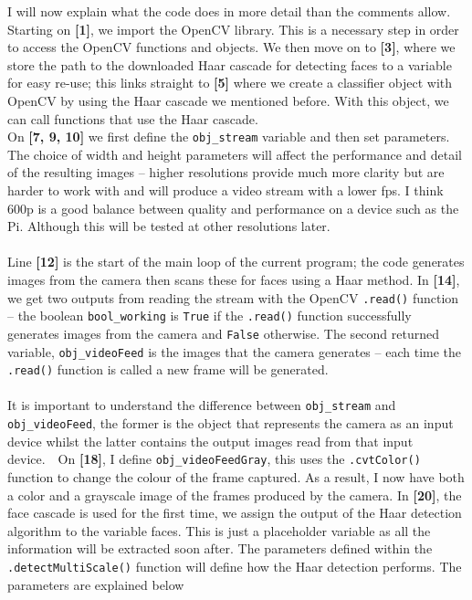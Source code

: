 \documentclass[9pt]{article}
\begin{document}
I will now explain what the code does in more detail than the comments allow.\\
Starting on \textbf{[1]}, we import the OpenCV library. This is a necessary step in order to access the OpenCV functions and objects. We then move on to \textbf{[3]}, where we store the path to the downloaded Haar cascade for detecting faces to a variable for easy re-use; this links straight to \textbf{[5]} where we create a classifier object with OpenCV by using the Haar cascade we mentioned before. With this object, we can call functions that use the Haar cascade.\\
On \textbf{[7, 9, 10]} we first define the \texttt{obj\_stream} variable and then set parameters. The choice of width and height parameters will affect the performance and detail of the resulting images -- higher resolutions provide much more clarity but are harder to work with and will produce a video stream with a lower fps. I think 600p is a good balance between quality and performance on a device such as the Pi. Although this will be tested at other resolutions later.\\\\
Line \textbf{[12]} is the start of the main loop of the current program; the code generates images from the camera then scans these for faces using a Haar method. In \textbf{[14]}, we get two outputs from reading the stream with the OpenCV \texttt{.read()} function -- the boolean \texttt{bool\_working} is \texttt{True} if the \texttt{.read()} function successfully generates images from the camera and \texttt{False} otherwise. The second returned variable, \texttt{obj\_videoFeed} is the images that the camera generates -- each time the \texttt{.read()} function is called a new frame will be generated.\\\\
It is important to understand the difference between \texttt{obj\_stream} and \texttt{obj\_videoFeed}, the former is the object that represents the camera as an input device whilst the latter contains the output images read from that input device.\	\
On \textbf{[18]}, I define \texttt{obj\_videoFeedGray}, this uses the \texttt{.cvtColor()} function to change the colour of the frame captured. As a result, I now have both a color and a grayscale image of the frames produced by the camera. In \textbf{[20]}, the face cascade is used for the first time, we assign the output of the Haar detection algorithm to the variable faces. This is just a placeholder variable as all the information will be extracted soon after. The parameters defined within the \texttt{.detectMultiScale()} function will define how the Haar detection performs. The parameters are explained below
\end{document}
